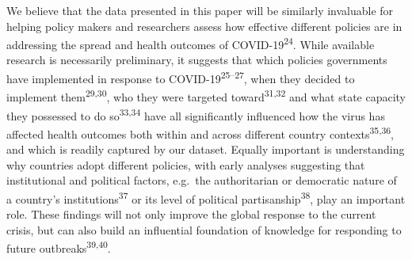 \documentclass[]{article}
\begin{document}
We believe that the data presented in this paper will be similarly invaluable for helping policy makers and researchers assess how effective different policies are in addressing the spread and health outcomes of COVID-19\textsuperscript{24}. While available research is necessarily preliminary, it suggests that which policies governments have implemented in response to COVID-19\textsuperscript{25--27}, when they decided to implement them\textsuperscript{29,30}, who they were targeted toward\textsuperscript{31,32} and what state capacity they possessed to do so\textsuperscript{33,34} have all significantly influenced how the virus has affected health outcomes both within and across different country contexts\textsuperscript{35,36}, and which is readily captured by our dataset. Equally important is understanding why countries adopt different policies, with early analyses suggesting that institutional and political factors, e.g.~the authoritarian or democratic nature of a country's institutions\textsuperscript{37} or its level of political partisanship\textsuperscript{38}, play an important role. These findings will not only improve the global response to the current crisis, but can also build an influential foundation of knowledge for responding to future outbreaks\textsuperscript{39,40}.
\end{document}
